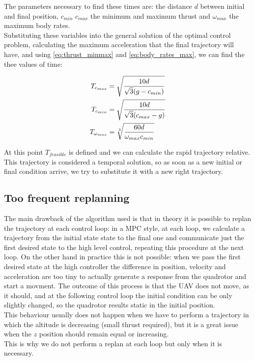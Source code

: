 The parameters necessary to find these times are: the distance $d$ between initial and final position, $c_{min}$ $c_{max}$ the minimum and maximum thrust and $\omega_{max}$ the maximum body rates.\\ Substituting these variables into the general solution of the optimal control problem, calculating the maximum acceleration that the final trajectory will have, and using \ref{eq:thrust_minmax}
 and \ref{eq:body_rates_max}, we can find the thee values of time:

\begin{align}
\begin{split}
T_{c_{max}} &= \sqrt{\dfrac{10d}{\sqrt{3}(g-c_{min})}} \\
T_{c_{min}} &= \sqrt{\frac{\displaystyle 10d}{\displaystyle \sqrt{3}(c_{max}-g)}} \\
T_{\omega_{max}} &= \sqrt[3]{\frac{\displaystyle 60d}{\displaystyle \omega_{max}c_{min}}}
\end{split}
\end{align}

At this point $T_{feasible}$ is defined and we can calculate the rapid trajectory relative. \\ 
This trajectory is considered a temporal solution, so as soon as a new initial or final condition arrive, we try to substitute it with a new right trajectory. 

\subsection{Too frequent replanning}
The main drawback of the algorithm used is that in theory it is possible to replan the trajectory at each control loop: in a MPC style, at each loop, we calculate a trajectory from the initial state state to the final one and communicate just the first desired state to the high level control, repeating this procedure at the next loop. On the other hand in practice this is not possible: when we pass the first desired state at the high controller 
the difference in position, velocity and acceleration are too tiny to actually generate a response from the quadrotor and start a movment. The outcome of this process is that the UAV does not move, as it should, and at the following control loop the initial condition can be only slightly changed, so the quadrotor results static in the initial position.\\
This behaviour usually does not happen when we have to perform a trajectory in which the altitude is decreasing (small thrust required), but it is a great issue when the $z$ position should remain equal or increasing.\\
This is why we do not perform a replan at each loop but only when it is necessary.

